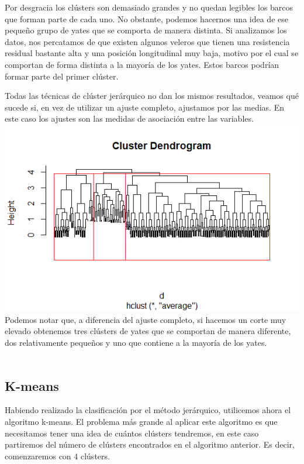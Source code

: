 \documentclass[twoside]{article}
\begin{document}
\begin{multicols}{2}
Por desgracia los cl\'usters son demasiado grandes y no quedan legibles los barcos que forman parte de cada uno. No obstante, podemos hacernos una idea de ese peque\~no grupo de yates que se comporta de manera distinta. Si analizamos los datos, nos percatamos de que existen algunos veleros que tienen una resistencia residual bastante alta y una posici\'on longitudinal muy baja, motivo por el cual se comportan de forma distinta a la mayor\'ia de los yates. Estos barcos podr\'ian formar parte del primer cl\'uster.

Todas las t\'ecnicas de cl\'uster jer\'arquico no dan los mismos resultados, veamos qu\'e sucede si, en vez de utilizar un ajuste completo, ajustamos por las medias. En este caso los ajustes son las medidas de asociaci\'on entre las variables.\\

\includegraphics[scale=0.5]{images/pic_31.png} \\

Podemos notar que, a diferencia del ajuste completo, si hacemos un corte muy elevado obtenemos tres cl\'usters de yates que se comportan de manera diferente, dos relativamente peque\~nos y uno que contiene a la mayor\'ia de los yates.\\\\




\subsection{K-means}
Habiendo realizado la clasificaci\'on por el m\'etodo jer\'arquico, utilicemos ahora el algoritmo k-means. El problema m\'as grande al aplicar este algoritmo es que necesitamos tener una idea de cu\'antos cl\'usters tendremos, en este caso partiremos del n\'umero de cl\'usters encontrados en el algoritmo anterior. Es decir, comenzaremos con $4$ cl\'usters.\\


\end{multicols}
\end{document}
